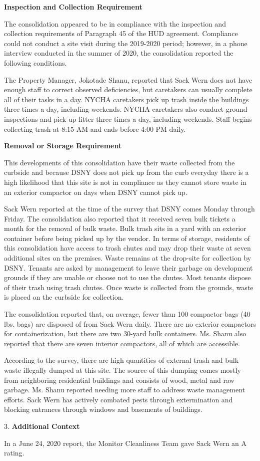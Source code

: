 
\textbf{Inspection and Collection Requirement}

The consolidation appeared to be in compliance with the inspection and collection requirements of Paragraph 45 of the HUD agreement. Compliance could not conduct a site visit during the 2019-2020 period; however, in a phone interview conducted in the summer of 2020, the consolidation reported the following conditions.

The Property Manager, Jokotade Shanu, reported that Sack Wern does not have enough staff to correct observed deficiencies, but caretakers can usually complete all of their tasks in a day. NYCHA caretakers pick up trash inside the buildings three times a day, including weekends. NYCHA caretakers also conduct ground inspections and pick up litter three times a day, including weekends. Staff begins collecting trash at 8:15 AM  and ends before 4:00 PM daily. 

\textbf{Removal or Storage Requirement}

This developments of this consolidation have their waste collected from the curbside and because DSNY does not pick up from the curb everyday there is a high likelihood that this site is not in compliance as they cannot store waste in an exterior compactor on days when DSNY cannot pick up.

Sack Wern reported at the time of the survey that DSNY comes Monday through Friday. The consolidation also reported that it received seven bulk tickets a month for the removal of bulk waste. Bulk trash sits in a yard with an exterior container before being picked up by the vendor. In terms of storage, residents of this consolidation have access to trash chutes and may drop their waste at seven additional sites on the premises. Waste remains at the drop-site for collection by DSNY. Tenants are asked by management to leave their garbage on development grounds if they are unable or choose not to use the chutes. Most tenants dispose of their trash using trash chutes. Once waste is collected from the grounds, waste is placed on the curbside for collection. 

The consolidation reported that, on average, fewer than 100 compactor bags (40 lbs. bags) are disposed of from Sack Wern daily. There are no exterior compactors for containerization, but there are two 30-yard bulk containers. Ms. Shanu also reported that there are seven interior compactors, all of which are accessible. 

According to the survey, there are high quantities of external trash and bulk waste illegally dumped at this site. The source of this dumping comes mostly from neighboring residential buildings and consists of wood, metal and raw garbage. Ms. Shanu reported needing more staff to address waste management efforts. Sack Wern has actively combated pests through extermination and blocking entrances through windows and basements of buildings.

3. \textbf{Additional Context} 

In a June 24, 2020 report, the Monitor Cleanliness Team gave Sack Wern an A rating. 